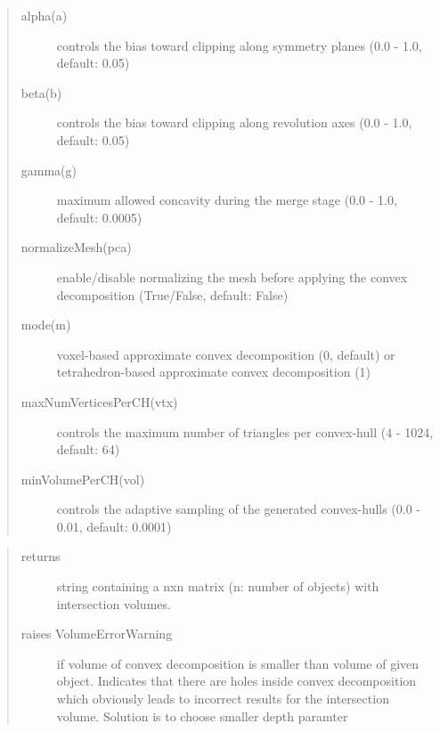 \documentclass[letterpaper,10pt,english]{sphinxmanual}
\begin{document}
\begin{description}
\begin{quote}
\begin{description}
\item[{alpha(a)}] \leavevmode
controls the bias toward clipping along symmetry planes (0.0 - 1.0, default: 0.05)

\item[{beta(b)}] \leavevmode
controls the bias toward clipping along revolution axes (0.0 - 1.0, default: 0.05)

\item[{gamma(g)}] \leavevmode
maximum allowed concavity during the merge stage (0.0 - 1.0, default: 0.0005)

\item[{normalizeMesh(pca)}] \leavevmode
enable/disable normalizing the mesh before applying the convex decomposition (True/False, default: False)

\item[{mode(m)}] \leavevmode
voxel-based approximate convex decomposition (0, default) or tetrahedron-based approximate convex decomposition (1)

\item[{maxNumVerticesPerCH(vtx)}] \leavevmode
controls the maximum number of triangles per convex-hull (4 - 1024, default: 64)

\item[{minVolumePerCH(vol)}] \leavevmode
controls the adaptive sampling of the generated convex-hulls (0.0 - 0.01, default: 0.0001)

\end{description}\end{quote}

\end{description}
\begin{quote}\begin{description}
\item[{returns}] \leavevmode
string containing a nxn matrix (n: number of objects) with intersection volumes.

\item[{raises VolumeErrorWarning}] \leavevmode
if volume of convex decomposition is smaller than volume of given object. Indicates that there are holes inside convex decomposition which obviously leads to incorrect results for the intersection volume. Solution is to choose smaller depth paramter

\end{description}\end{quote}
\end{document}
